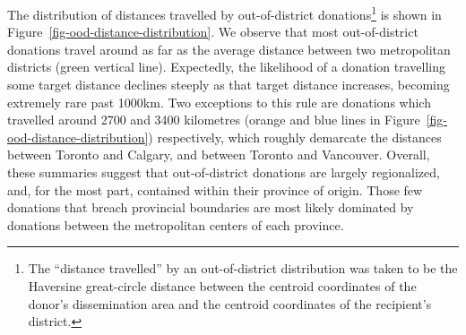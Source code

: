 \documentclass[
  letterpaper,
  DIV=11,
  numbers=noendperiod]{scrartcl}
\begin{document}
The distribution of distances travelled by out-of-district
donations\footnote{The ``distance travelled'' by an out-of-district
  distribution was taken to be the Haversine great-circle distance
  between the centroid coordinates of the donor's dissemination area and
  the centroid coordinates of the recipient's district.} is shown in
Figure~\ref{fig-ood-distance-distribution}. We observe that most
out-of-district donations travel around as far as the average distance
between two metropolitan districts (green vertical line). Expectedly,
the likelihood of a donation travelling some target distance declines
steeply as that target distance increases, becoming extremely rare past
1000km. Two exceptions to this rule are donations which travelled around
2700 and 3400 kilometres (orange and blue lines in
Figure~\ref{fig-ood-distance-distribution}) respectively, which roughly
demarcate the distances between Toronto and Calgary, and between Toronto
and Vancouver. Overall, these summaries suggest that out-of-district
donations are largely regionalized, and, for the most part, contained
within their province of origin. Those few donations that breach
provincial boundaries are most likely dominated by donations between the
metropolitan centers of each province.
\end{document}
